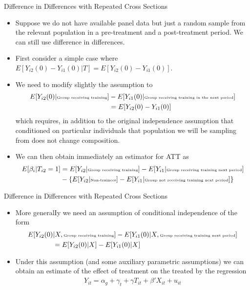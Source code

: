 \documentclass[xcolor=pdftex,dvipsnames,table,mathserif,aspectratio=169]{beamer}
\begin{document}
\begin{frame}{Difference in Differences with Repeated Cross Sections}
\small
\begin{itemize}
\item Suppose we do not have available panel data but just a random sample from the relevant population in a pre-treatment and a post-treatment period. We can still use difference in differences.
\item First consider a simple case where {\small $E[Y_{i2}(0)- Y_{i1}(0) | T] = E[Y_{i2}(0)- Y_{i1}(0)]$}.
\item We need to modify slightly the assumption to
\vspace{-.5pc}
\begin{align*}
E[Y_{i2}(0) | \text{\tiny Group receiving training}]&-E[Y_{i1}(0) | \text{\tiny Group receiving training in the next period}] \\
&= E[Y_{i2}(0)-Y_{i1}(0)]  
\end{align*}
which requires, in addition to the original independence
assumption that conditioned on particular individuals that population we will be sampling from does not change composition.
\item We can then obtain immediately an estimator for ATT as
\begin{align*}
E[\beta_i |T_{i2}=1] 
&= E[Y_{i2}| \text{\tiny Group receiving training}]-E[Y_{i1}| \text{\tiny Group receiving training next period}] \\
&- \{E[Y_{i2} | \text{\tiny Non-trainees}] - E[Y_{i1} | \text{\tiny Group not receiving training next period}]\}
\end{align*}
\end{itemize}
\end{frame}


\begin{frame}{Difference in Differences with Repeated Cross Sections}
\begin{itemize}
\item More generalIy we need an assumption of conditional independence of the form
\begin{align*}
E[Y_{i2}(0) & | X, \text{\tiny Group receiving training}]-E[Y_{i1}(0) | X, \text{\tiny Group receiving training next period}] \\
&= E[Y_{i2}(0) | X] - E[Y_{i1}(0) |X]
\end{align*}
\item Under this assumption (and some auxiliary parametric assumptions) we can obtain an estimate of the effect of treatment on the treated by the regression
\begin{align*}
Y_{it} = \alpha_g + \gamma_t + \gamma T_{it} + \beta' X_{it} + u_{it}
\end{align*} 
\end{itemize}
\end{frame}
\end{document}

